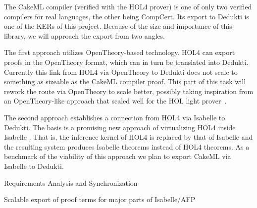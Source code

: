 \begin{workpackage}[id=libraries,wphases=0-48,type=RTD,
  short=Libraries,%
  title=Libraries,
  lead=Inr,
  InrRM=10,
  TumRM=42]
\begin{tasklist}
\begin{task}[id=cakeml,title=The CakeML compiler library]
The CakeML
compiler \cite{KumarMNO14} (verified with the HOL4 prover) is one of only two verified compilers for real
languages, the other being CompCert. Its export to Dedukti is one of
the KERs of this project. Because of the size and importance of this
library, we will approach the export from two angles.

The first approach utilizes OpenTheory-based technology. HOL4 can
export proofs in the OpenTheory format, which can in turn be
translated into Dedukti. Currently this link from HOL4 via OpenTheory
to Dedukti does not scale to something as sizeable as the CakeML
compiler proof. This part of this task will rework the route via
OpenTheory to scale better, possibly taking inspiration from an
OpenTheory-like approach that scaled well for the HOL light
prover~\cite{KaliszykK13}.

The second approach establishes a connection from HOL4 via Isabelle to
Dedukti. The basis is a promising new approach of virtualizing HOL4
inside Isabelle \cite{ImmlerRW19}. That is, the inference kernel of
HOL4 is replaced by that of Isabelle and the resulting system produces
Isabelle theorems instead of HOL4 theorems. As a benchmark of the
viability of this approach we plan to export CakeML via Isabelle to
Dedukti.
\end{task}



\end{tasklist}

\begin{wpdelivs}
  \begin{wpdeliv}[due=3,miles=startup,id=requirements,dissem=PU,nature=DEM,lead=Inr]
      {Requirements Analysis and Synchronization}
\end{wpdeliv}
  \begin{wpdeliv}[due=36,miles=isabelle-stdlib,id=requirements,dissem=PU,nature=DEM,lead=Tum]
      {Scalable export of proof terms for major parts of Isabelle/AFP}
  \end{wpdeliv}
\end{wpdelivs}
\end{workpackage}

